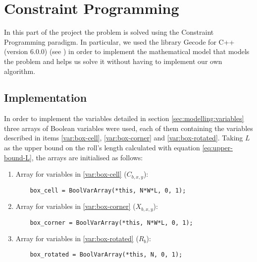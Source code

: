 \section{Constraint Programming}
\label{sec:constraint-programming}

In this part of the project the problem is solved using the Constraint Programming
paradigm. In particular, we used the library Gecode for C++ (version 6.0.0)
(see \cite{GecodeWEB}) in order to implement the mathematical model that models
the problem and helps us solve it without having to implement our own algorithm.

\subsection{Implementation}
\label{sec:constraint-programming:implementation}

In order to implement the variables detailed in section \ref{sec:modelling:variables}
three arrays of Boolean variables were used, each of them containing the variables described
in items \ref{var:box-cell}, \ref{var:box-corner} and \ref{var:box-rotated}. Taking
$L$ as the upper bound on the roll's length calculated with equation \ref{eq:upper-bound-L},
the arrays are initialised as follows:

\begin{enumerate}
	\item Array for variables in \ref{var:box-cell} ($C_{b,x,y}$):
    
	{\NOINDENT \begin{lstlisting}
	box_cell = BoolVarArray(*this, N*W*L, 0, 1);
	\end{lstlisting}}
    
	\item Array for variables in \ref{var:box-corner} ($X_{b,x,y}$):
    
	{\NOINDENT \begin{lstlisting}
	box_corner = BoolVarArray(*this, N*W*L, 0, 1);
	\end{lstlisting}}
    
	\item Array for variables in \ref{var:box-rotated} ($R_b$):
    
	{\NOINDENT \begin{lstlisting}
	box_rotated = BoolVarArray(*this, N, 0, 1);
	\end{lstlisting}}
    
\end{enumerate}

